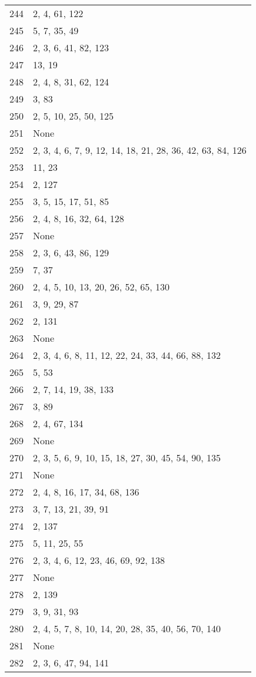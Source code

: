 \documentclass[12pt]{article}
\begin{document}
\begin{tabular}{|r|l|}
244 & 2, 4, 61, 122 \\ 
245 & 5, 7, 35, 49 \\ 
246 & 2, 3, 6, 41, 82, 123 \\ 
247 & 13, 19 \\ 
248 & 2, 4, 8, 31, 62, 124 \\ 
249 & 3, 83 \\ 
250 & 2, 5, 10, 25, 50, 125 \\ 
251 & None \\ 
252 & 2, 3, 4, 6, 7, 9, 12, 14, 18, 21, 28, 36, 42, 63, 84, 126 \\ 
253 & 11, 23 \\ 
254 & 2, 127 \\ 
255 & 3, 5, 15, 17, 51, 85 \\ 
256 & 2, 4, 8, 16, 32, 64, 128 \\ 
257 & None \\ 
258 & 2, 3, 6, 43, 86, 129 \\ 
259 & 7,  37 \\ 
260 & 2, 4, 5, 10, 13, 20, 26, 52, 65, 130 \\ 
261 & 3, 9, 29, 87 \\ 
262 & 2, 131 \\ 
263 & None \\ 
264 & 2, 3, 4, 6, 8, 11, 12, 22, 24, 33, 44, 66, 88,  132 \\ 
265 & 5, 53 \\ 
266 & 2, 7, 14, 19, 38, 133 \\ 
267 & 3, 89 \\ 
268 & 2, 4, 67, 134 \\ 
269 & None \\ 
270 & 2, 3, 5, 6, 9, 10, 15, 18, 27, 30, 45, 54, 90,  135 \\ 
271 & None \\ 
272 & 2, 4, 8, 16, 17, 34, 68, 136 \\ 
273 & 3, 7, 13, 21, 39, 91 \\ 
274 & 2, 137 \\ 
275 & 5, 11, 25, 55 \\ 
276 & 2, 3, 4, 6, 12, 23, 46, 69, 92, 138 \\ 
277 & None \\ 
278 & 2, 139 \\ 
279 & 3, 9, 31, 93 \\ 
280 & 2, 4, 5, 7, 8, 10, 14, 20, 28,  35, 40, 56, 70, 140 \\ 
281 & None \\ 
282 & 2, 3, 6, 47, 94,  141 \\ 

\end{tabular}
\end{document}
